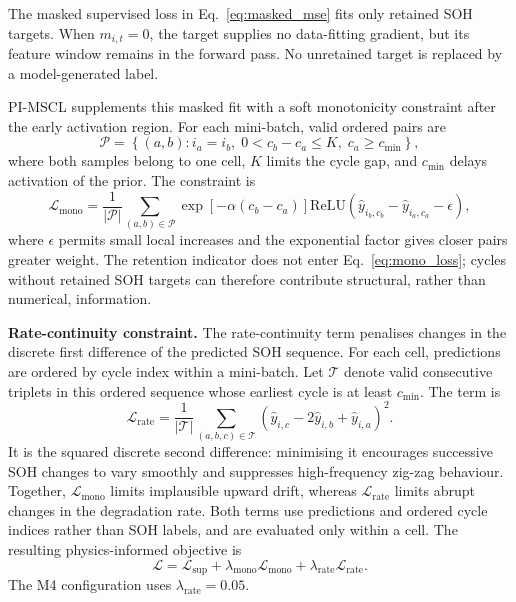 \documentclass[pdflatex,sn-mathphys-num]{sn-jnl}
\begin{document}
The masked supervised loss in Eq.~\eqref{eq:masked_mse} fits only retained SOH targets. When $m_{i,t}=0$, the target supplies no data-fitting gradient, but its feature window remains in the forward pass. No unretained target is replaced by a model-generated label.

PI-MSCL supplements this masked fit with a soft monotonicity constraint after the early activation region. For each mini-batch, valid ordered pairs are
\begin{equation}
\mathcal{P}=\left\{(a,b): i_a=i_b,\;0<c_b-c_a\leq K,\;c_a\geq c_{\min}\right\},
\label{eq:pair_set}
\end{equation}
where both samples belong to one cell, $K$ limits the cycle gap, and $c_{\min}$ delays activation of the prior. The constraint is
\begin{equation}
\mathcal{L}_{\mathrm{mono}}=
\frac{1}{|\mathcal{P}|}\sum_{(a,b)\in\mathcal{P}}
\exp[-\alpha(c_b-c_a)]
\mathrm{ReLU}\left(\hat{y}_{i_b,c_b}-\hat{y}_{i_a,c_a}-\epsilon\right),
\label{eq:mono_loss}
\end{equation}
where $\epsilon$ permits small local increases and the exponential factor gives closer pairs greater weight. The retention indicator does not enter Eq.~\eqref{eq:mono_loss}; cycles without retained SOH targets can therefore contribute structural, rather than numerical, information.

\noindent\textbf{Rate-continuity constraint.}
The rate-continuity term penalises changes in the discrete first difference of the predicted SOH sequence. For each cell, predictions are ordered by cycle index within a mini-batch. Let $\mathcal{T}$ denote valid consecutive triplets in this ordered sequence whose earliest cycle is at least $c_{\min}$. The term is
\begin{equation}
\mathcal{L}_{\mathrm{rate}}=
\frac{1}{|\mathcal{T}|}\sum_{(a,b,c)\in\mathcal{T}}
\left(\hat{y}_{i,c}-2\hat{y}_{i,b}+\hat{y}_{i,a}\right)^2.
\label{eq:rate_loss}
\end{equation}
It is the squared discrete second difference: minimising it encourages successive SOH changes to vary smoothly and suppresses high-frequency zig-zag behaviour. Together, $\mathcal{L}_{\mathrm{mono}}$ limits implausible upward drift, whereas $\mathcal{L}_{\mathrm{rate}}$ limits abrupt changes in the degradation rate. Both terms use predictions and ordered cycle indices rather than SOH labels, and are evaluated only within a cell. The resulting physics-informed objective is
\begin{equation}
\mathcal{L}=\mathcal{L}_{\mathrm{sup}}+\lambda_{\mathrm{mono}}\mathcal{L}_{\mathrm{mono}}+\lambda_{\mathrm{rate}}\mathcal{L}_{\mathrm{rate}}.
\label{eq:total_loss}
\end{equation}
The M4 configuration uses $\lambda_{\mathrm{rate}}=0.05$.
\end{document}
